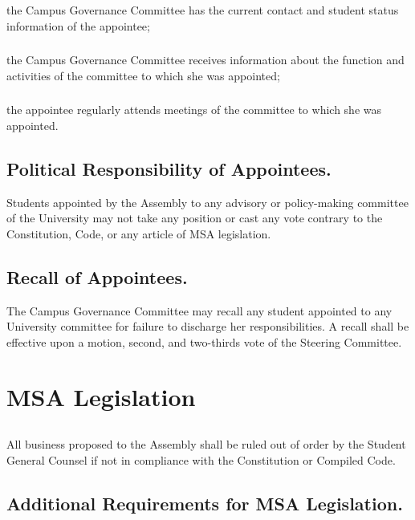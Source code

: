 \subsubsection{}
the Campus Governance Committee has the current contact and student status information of the appointee;
\subsubsection{}
the Campus Governance Committee receives information about the function and activities of the committee to which she was appointed;
\subsubsection{}
the appointee regularly attends meetings of the committee to which she was appointed.

\subsection{Political Responsibility of Appointees.}
Students appointed by the Assembly to any advisory or policy-making committee of the University may not take any position or cast any vote contrary to the Constitution, Code, or any article of MSA legislation.

\subsection{Recall of Appointees.}
The Campus Governance Committee may recall any student appointed to any University committee for failure to discharge her responsibilities.  A recall shall be effective upon a motion, second, and two-thirds vote of the Steering Committee.


\section{MSA Legislation}

\subsection{}
All business proposed to the Assembly shall be ruled out of order by the Student General Counsel if not in compliance with the Constitution or Compiled Code.

\subsection{Additional Requirements for MSA Legislation.}

